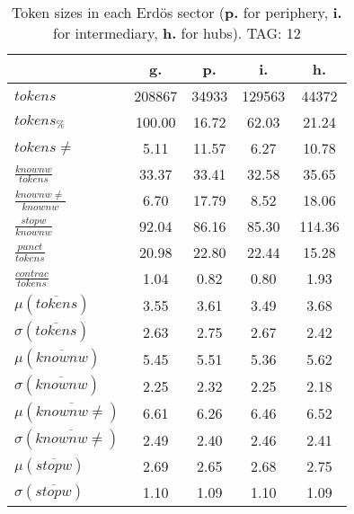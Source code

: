\begin{table}[h!]
\begin{center}
\begin{tabular}{| l || c | c | c | c |}\hline
 & {\bf g.} & {\bf p.} & {\bf i.} & {\bf h.} \\\hline\hline
$tokens$ & 208867  & 34933  & 129563  & 44372 \\
$tokens_{\%}$ & 100.00  & 16.72  & 62.03  & 21.24 \\
$tokens \neq$ & 5.11  & 11.57  & 6.27  & 10.78 \\\hline
$\frac{knownw}{tokens}$ & 33.37  & 33.41  & 32.58  & 35.65 \\
$\frac{knownw \neq}{knownw}$ & 6.70  & 17.79  & 8.52  & 18.06 \\\hline
$\frac{stopw}{knownw}$ & 92.04  & 86.16  & 85.30  & 114.36 \\
$\frac{punct}{tokens}$ & 20.98  & 22.80  & 22.44  & 15.28 \\
$\frac{contrac}{tokens}$ & 1.04  & 0.82  & 0.80  & 1.93 \\\hline\hline
$\mu(\overline{tokens})$ & 3.55  & 3.61  & 3.49  & 3.68 \\
$\sigma(\overline{tokens})$ & 2.63  & 2.75  & 2.67  & 2.42 \\\hline
$\mu(\overline{knownw})$ & 5.45  & 5.51  & 5.36  & 5.62 \\
$\sigma(\overline{knownw})$ & 2.25  & 2.32  & 2.25  & 2.18 \\\hline
$\mu(\overline{knownw \neq})$ & 6.61  & 6.26  & 6.46  & 6.52 \\
$\sigma(\overline{knownw \neq})$ & 2.49  & 2.40  & 2.46  & 2.41 \\\hline
$\mu(\overline{stopw})$ & 2.69  & 2.65  & 2.68  & 2.75 \\
$\sigma(\overline{stopw})$ & 1.10  & 1.09  & 1.10  & 1.09 \\\hline
\end{tabular}
\caption{Token sizes in each Erd\"os sector ({{\bf p.}} for periphery, {{\bf i.}} for intermediary, {{\bf h.}} for hubs). TAG: 12}
\end{center}
\end{table}